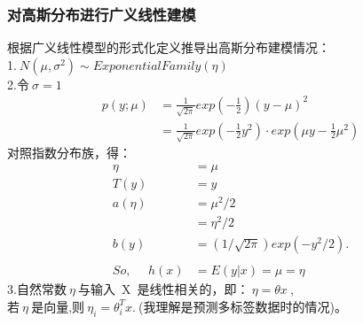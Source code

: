 \subsubsection{对高斯分布进行广义线性建模}
根据广义线性模型的形式化定义推导出高斯分布建模情况：\\
1.$~N(\mu,\sigma^2)\sim ExponentialFamily(\eta)$\\
2.令$~\sigma=1~$
\begin{equation}\nonumber
\begin{split}
  p(y;\mu)&=\frac{1}{\sqrt{2\pi}}exp(-\frac{1}{2})(y-\mu)^2\\
          &=\frac{1}{\sqrt{2\pi}}exp(-\frac{1}{2}y^2)\cdot exp(\mu y-\frac{1}{2} \mu ^2)
\end{split}
\end{equation}
对照指数分布族，得：
\begin{equation}\nonumber
\begin{split}
  \eta &= \mu\\
  T(y) &= y\\
  a(\eta)&=\mu^2/2\\
         &=\eta^2/2\\
  b(y)   &=(1/\sqrt{2\pi})exp(-y^2/2).\\
  ~\\
 So,~~~~~~ h(x) &=E(y|x)=\mu=\eta
\end{split}
\end{equation}
3.自然常数$~\eta~$与输入~X~是线性相关的，即：$~\eta = \theta x~$,\\
若$~\eta~$是向量,则$~\eta_i = \theta_i^T x.~$(我理解是预测多标签数据时的情况)。

